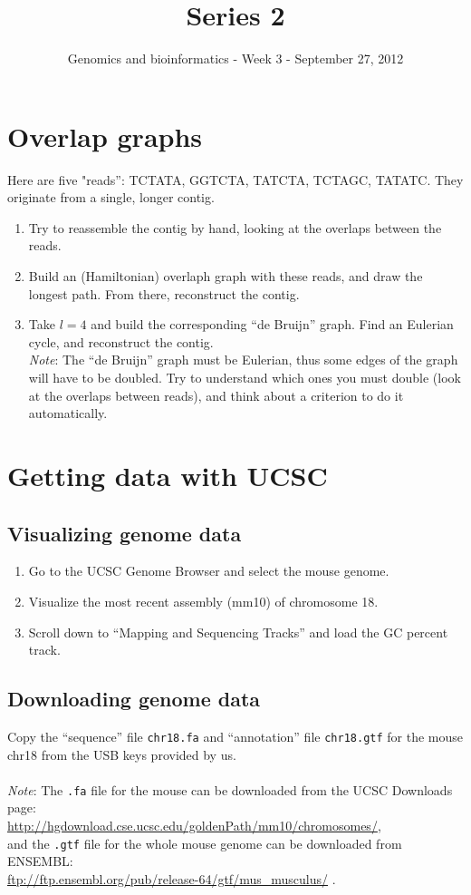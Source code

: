 \documentclass[a4paper,11pt]{article}
\title{Series 2}
\date{}
\author{Genomics and bioinformatics - Week 3 - September 27, 2012}
\begin{document}
\maketitle

\section{Overlap graphs}
Here are five "reads'': TCTATA, GGTCTA, TATCTA, TCTAGC, TATATC. They originate from a single, longer contig.
\begin{enumerate}
\item Try to reassemble the contig by hand, looking at the overlaps between the reads.
\item Build an (Hamiltonian) overlaph graph with these reads, and draw the longest path.
From there, reconstruct the contig.
\item Take $l=4$ and build the corresponding ``de Bruijn'' graph. Find an Eulerian cycle, and reconstruct the contig. \\
\textit{Note}: The ``de Bruijn'' graph must be Eulerian, thus some edges of the graph will have to be doubled.
Try to understand which ones you must double (look at the overlaps between reads), and think about a
criterion to do it automatically.
\end{enumerate}

\section{Getting data with UCSC}
\subsection{Visualizing genome data}
\begin{enumerate}
\item Go to the UCSC Genome Browser and select the mouse genome.
\item Visualize the most recent assembly (mm10) of chromosome 18.
\item Scroll down to ``Mapping and Sequencing Tracks'' and load the GC percent track.
\end{enumerate}

\subsection{Downloading genome data}
Copy the ``sequence'' file \texttt{chr18.fa} and ``annotation'' file \texttt{chr18.gtf} for the mouse chr18 from the USB keys provided by us. \\\\
\textit{Note}: The \texttt{.fa} file for the mouse can be downloaded from the UCSC Downloads page:\\
\url{http://hgdownload.cse.ucsc.edu/goldenPath/mm10/chromosomes/},\\
and the \texttt{.gtf} file for the whole mouse genome can be downloaded from ENSEMBL:\\
\url{ftp://ftp.ensembl.org/pub/release-64/gtf/mus_musculus/} .
\end{document}
